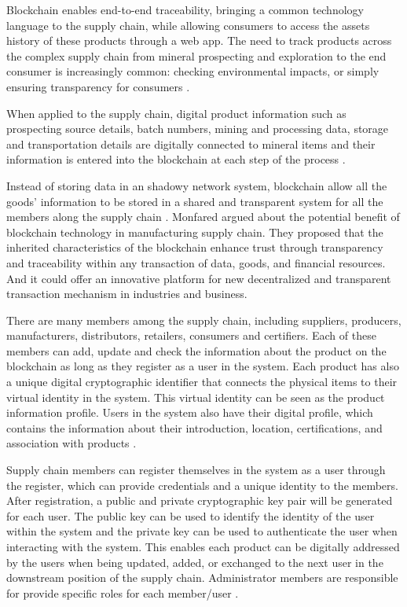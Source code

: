 Blockchain enables end-to-end traceability, bringing a common technology language to the supply chain, while allowing consumers to access the assets history of these products through a web app. The need to track products across the complex supply chain from mineral prospecting and exploration to the end consumer is increasingly common: checking environmental impacts, or simply ensuring transparency for consumers \cite{galvez2018future}.

When applied to the supply chain, digital product information such as prospecting source details, batch numbers, mining and processing data, storage and transportation details are digitally connected to mineral items and their information is entered into the blockchain at each step of the process \cite{caro2018blockchain}.

Instead of storing data in an shadowy network system, blockchain allow all the goods' information to be stored in a shared and transparent system for all the members along the supply chain \cite{tian2017supply}. Monfared \cite{abeyratne2016blockchain} argued about the potential benefit of blockchain technology in manufacturing supply chain. They proposed that the inherited characteristics of the blockchain enhance trust through transparency and traceability within any transaction of data, goods, and financial resources. And it could offer an innovative platform for new decentralized and transparent transaction mechanism in industries and business.

There are many members among the supply chain, including suppliers, producers, manufacturers, distributors, retailers, consumers and certifiers. Each of these members can add, update and check the information about the product on the blockchain as long as they register as a user in the system. Each product has also a unique digital cryptographic identifier that connects the physical items to their virtual identity in the system. This virtual identity can be seen as the product information profile. Users in the system also have their digital profile, which contains the information about their introduction, location, certifications, and association with products \cite{tian2017supply}.

Supply chain members can register themselves in the system as a user through the register, which can provide credentials and a unique identity to the members. After registration, a public and private cryptographic key pair will be generated for each user. The public key can be used to identify the identity of the user within the system and the private key can be used to authenticate the user when interacting with the system. This enables each product can be digitally addressed by the users when being updated, added, or exchanged to the next user in the downstream position of the supply chain. Administrator members are responsible for provide specific roles for each member/user \cite{caro2018blockchain}.

